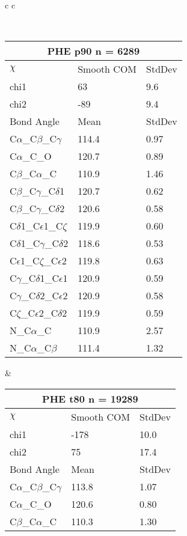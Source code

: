 \newpage

\begin{longtable}{ c c }

\caption{PHE Central Values}\\
  \begin{tabular}{ l l l }
  \toprule
  \multicolumn{3}{c}{PHE \textbf{p90} n = 6289} \\ \toprule
  $\chi$       & Smooth COM & StdDev \\ \midrule
  chi1 & 63 & 9.6 \\ 
  chi2 & -89 & 9.4 \\ \midrule
  Bond Angle   & Mean     & StdDev \\ \midrule
  C$\alpha$\_C$\beta$\_C$\gamma$ & 114.4 & 0.97\\
  C$\alpha$\_C\_O & 120.7 & 0.89\\
  C$\beta$\_C$\alpha$\_C & 110.9 & 1.46\\
  C$\beta$\_C$\gamma$\_C$\delta$1 & 120.7 & 0.62\\
  C$\beta$\_C$\gamma$\_C$\delta$2 & 120.6 & 0.58\\
  C$\delta$1\_C$\epsilon$1\_C$\zeta$ & 119.9 & 0.60\\
  C$\delta$1\_C$\gamma$\_C$\delta$2 & 118.6 & 0.53\\
  C$\epsilon$1\_C$\zeta$\_C$\epsilon$2 & 119.8 & 0.63\\
  C$\gamma$\_C$\delta$1\_C$\epsilon$1 & 120.9 & 0.59\\
  C$\gamma$\_C$\delta$2\_C$\epsilon$2 & 120.9 & 0.58\\
  C$\zeta$\_C$\epsilon$2\_C$\delta$2 & 119.9 & 0.59\\
  N\_C$\alpha$\_C & 110.9 & 2.57\\
  N\_C$\alpha$\_C$\beta$ & 111.4 & 1.32\\
  \bottomrule
  \end{tabular}
  &
  \begin{tabular}{ l l l }
  \toprule
  \multicolumn{3}{c}{PHE \textbf{t80} n = 19289} \\ \toprule
  $\chi$       & Smooth COM & StdDev \\ \midrule
  chi1 & -178 & 10.0 \\ 
  chi2 & 75 & 17.4 \\ \midrule
  Bond Angle   & Mean     & StdDev \\ \midrule
  C$\alpha$\_C$\beta$\_C$\gamma$ & 113.8 & 1.07\\
  C$\alpha$\_C\_O & 120.6 & 0.80\\
  C$\beta$\_C$\alpha$\_C & 110.3 & 1.30\\

\end{tabular}
\end{longtable}
